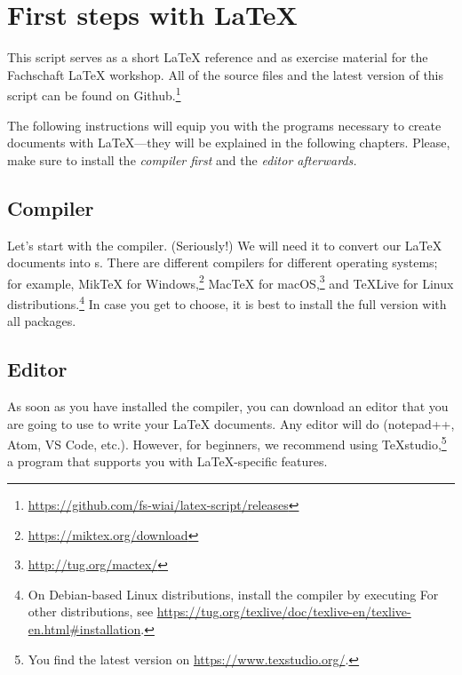 \newpage
{}
\pagecolor{latexblue}


\chapter*{First steps with \LaTeX}

This script serves as a short \LaTeX{} reference and as exercise material for the Fachschaft  \LaTeX{} workshop.
All of the source files and the latest version of this script can be found on Github.\footnote{\url{https://github.com/fs-wiai/latex-script/releases}}

The following instructions will equip you with the programs necessary to create documents with \LaTeX{}---they will be explained in the following chapters.
Please, make sure to install the \emph{compiler first} and the \emph{editor afterwards}\textit{.}

\section*{Compiler}
Let’s start with the compiler.
(Seriously!)
We will need it to convert our \LaTeX{} documents into s.
There are different compilers for different operating systems;
for example, MikTeX for Windows,\footnote{\url{https://miktex.org/download}} Mac\TeX{} for macOS,\footnote{\url{http://tug.org/mactex/}} and \TeX{}Live for Linux distributions.\footnote{On Debian-based Linux distributions, install the compiler by executing 
For other distributions, see \url{https://tug.org/texlive/doc/texlive-en/texlive-en.html\#installation}.}
In case you get to choose, it is best to install the full version with all packages.

\section*{Editor}
As soon as you have installed the compiler, you can download an editor that you are going to use to write your \LaTeX{} documents.
Any editor will do (notepad++, Atom, VS Code, etc.).
However, for beginners, we recommend using \TeX{}studio,\footnote{You find the latest version on \url{https://www.texstudio.org/}.} a program that supports you with \LaTeX-specific features.

